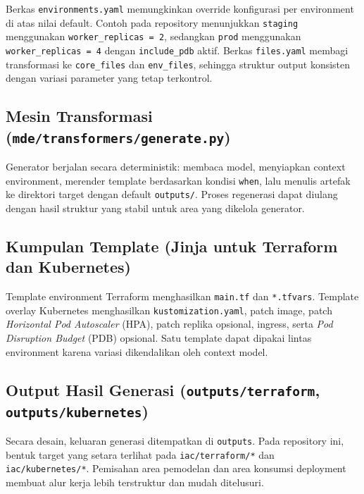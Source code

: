 Berkas \texttt{environments.yaml} memungkinkan override konfigurasi per environment di atas nilai default. Contoh pada repository menunjukkan \texttt{staging} menggunakan \texttt{worker\_replicas = 2}, sedangkan \texttt{prod} menggunakan \texttt{worker\_replicas = 4} dengan \texttt{include\_pdb} aktif. Berkas \texttt{files.yaml} membagi transformasi ke \texttt{core\_files} dan \texttt{env\_files}, sehingga struktur output konsisten dengan variasi parameter yang tetap terkontrol.

\subsection[Mesin Transformasi]{Mesin Transformasi (\texttt{mde/transformers/generate.py})}\label{subsec:mde-mesin-transformasi}

Generator berjalan secara deterministik: membaca model, menyiapkan context environment, merender template berdasarkan kondisi \texttt{when}, lalu menulis artefak ke direktori target dengan default \texttt{outputs/}. Proses regenerasi dapat diulang dengan hasil struktur yang stabil untuk area yang dikelola generator.

\subsection[Kumpulan Template]{Kumpulan Template (Jinja untuk Terraform dan Kubernetes)}\label{subsec:mde-kumpulan-template}

Template environment Terraform menghasilkan \texttt{main.tf} dan \texttt{*.tfvars}. Template overlay Kubernetes menghasilkan \texttt{kustomization.yaml}, patch image, patch \textit{Horizontal Pod Autoscaler} (HPA), patch replika opsional, ingress, serta \textit{Pod Disruption Budget} (PDB) opsional. Satu template dapat dipakai lintas environment karena variasi dikendalikan oleh context model.

\subsection[Output Hasil Generasi]{Output Hasil Generasi (\texttt{outputs/terraform}, \texttt{outputs/kubernetes})}\label{subsec:mde-output-generasi}

Secara desain, keluaran generasi ditempatkan di \texttt{outputs}. Pada repository ini, bentuk target yang setara terlihat pada \texttt{iac/terraform/*} dan \texttt{iac/kubernetes/*}. Pemisahan area pemodelan dan area konsumsi deployment membuat alur kerja lebih terstruktur dan mudah ditelusuri.

